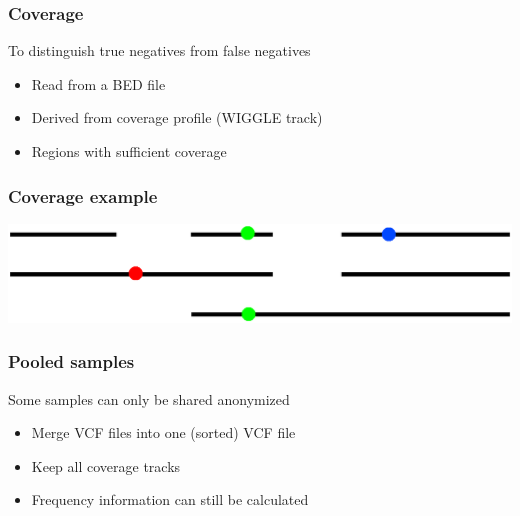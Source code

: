 \documentclass[slidestop]{beamer}
\begin{document}
\begin{frame}
  \frametitle{Coverage}
  To distinguish true negatives from false negatives
  \begin{itemize}
    \item Read from a BED file
    \item Derived from coverage profile (WIGGLE track)
    \item Regions with sufficient coverage
  \end{itemize}
  \begin{center}
  \end{center}
\end{frame}

\begin{frame}
  \frametitle{Coverage example}
  \begin{center}
    \includegraphics[width=\textwidth]{frequencies}
  \end{center}
\end{frame}

\begin{frame}
  \frametitle{Pooled samples}
  Some samples can only be shared anonymized
  \begin{itemize}
    \item Merge VCF files into one (sorted) VCF file
    \item Keep all coverage tracks
    \item Frequency information can still be calculated
  \end{itemize}
\end{frame}
\end{document}
